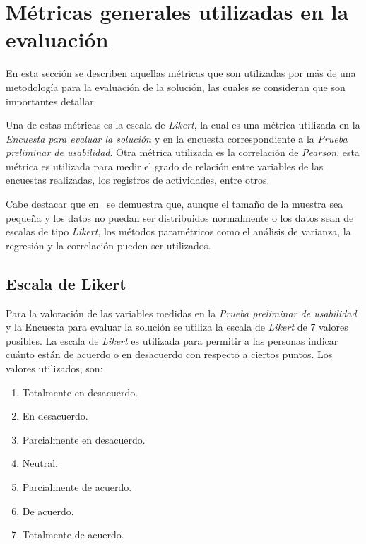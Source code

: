 
\section{Métricas generales utilizadas en la evaluación}

En esta sección se describen aquellas métricas que son utilizadas por 
más de una metodología para la evaluación de la solución, las 
cuales se consideran que son importantes detallar.

Una de estas métricas es la escala de \textit{Likert}, la cual es una métrica utilizada 
en la \emph{Encuesta para evaluar la solución}
y en la encuesta correspondiente a la \emph{Prueba preliminar de usabilidad}. Otra métrica 
utilizada es la correlación de \textit{Pearson}, esta
métrica es utilizada para medir el grado de relación entre variables de las
encuestas realizadas, los registros de actividades, entre otros.

Cabe destacar que en~\cite{norman2010likert} se demuestra que, aunque el tamaño
de la muestra sea pequeña y los datos no puedan ser distribuidos normalmente o
los datos sean de escalas de tipo \textit{Likert}, los métodos paramétricos como
el análisis de varianza, la regresión y la correlación pueden ser utilizados.


\subsection{Escala de Likert}
\label{sec:likert}

Para la valoración de las variables medidas en la \emph{Prueba preliminar de usabilidad} y 
la {Encuesta para evaluar la solución} se utiliza la escala de
\textit{Likert}\cite{Allen:2007} de 7 valores posibles. La escala de
\textit{Likert} es utilizada para permitir a las personas indicar cuánto están
de acuerdo o en desacuerdo con respecto a ciertos puntos. Los valores
utilizados, son:

\begin{enumerate}
    \item Totalmente en desacuerdo.
    \item En desacuerdo.
    \item Parcialmente en desacuerdo.
    \item Neutral.
    \item Parcialmente de acuerdo.
    \item De acuerdo.
    \item Totalmente de acuerdo.
\end{enumerate}

